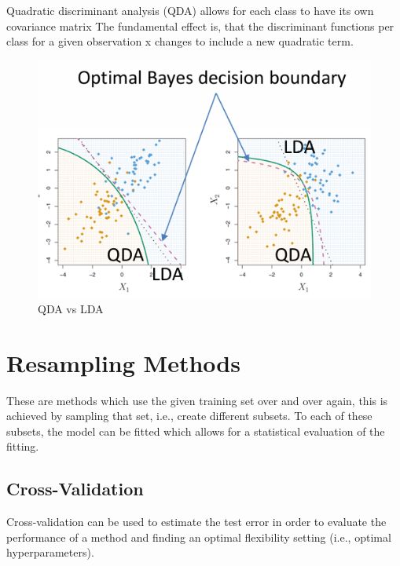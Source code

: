 \documentclass[../Main.tex]{subfiles}
\begin{document}
Quadratic discriminant analysis (QDA) 
allows for each class to have its own 
covariance matrix
The fundamental effect is, that the 
discriminant functions per class for a 
given observation x changes to 
include a new quadratic term.

\begin{figure}[H]
    \centering
    \includegraphics[width=0.75\linewidth]{Images/qda-vs-lda.png}
    \caption{QDA vs LDA}
\end{figure}

\newpage

\section{Resampling Methods}
These are methods which use the given training 
set over and over again, this is achieved by sampling that set, i.e., 
create different subsets. To each of these subsets, the model 
can be fitted which allows for a statistical evaluation of the fitting.

\subsection{Cross-Validation}
Cross-validation can be used to estimate 
the test error in order to evaluate the 
performance of a method and finding an 
optimal flexibility setting (i.e., optimal hyperparameters).
\end{document}
